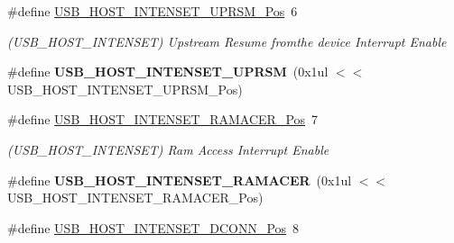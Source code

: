 \begin{DoxyCompactItemize}
\item 
\hypertarget{group___s_a_m_l21___u_s_b_ga447cdc0932f5fadd6ca31dabbf7ed24f}{}\#define \hyperlink{group___s_a_m_l21___u_s_b_ga447cdc0932f5fadd6ca31dabbf7ed24f}{U\+S\+B\+\_\+\+H\+O\+S\+T\+\_\+\+I\+N\+T\+E\+N\+S\+E\+T\+\_\+\+U\+P\+R\+S\+M\+\_\+\+Pos}~6\label{group___s_a_m_l21___u_s_b_ga447cdc0932f5fadd6ca31dabbf7ed24f}

\begin{DoxyCompactList}\small\item\em (U\+S\+B\+\_\+\+H\+O\+S\+T\+\_\+\+I\+N\+T\+E\+N\+S\+E\+T) Upstream Resume fromthe device Interrupt Enable \end{DoxyCompactList}\item 
\hypertarget{group___s_a_m_l21___u_s_b_ga113619d8b57aecb308c0adb79c029053}{}\#define {\bfseries U\+S\+B\+\_\+\+H\+O\+S\+T\+\_\+\+I\+N\+T\+E\+N\+S\+E\+T\+\_\+\+U\+P\+R\+S\+M}~(0x1ul $<$$<$ U\+S\+B\+\_\+\+H\+O\+S\+T\+\_\+\+I\+N\+T\+E\+N\+S\+E\+T\+\_\+\+U\+P\+R\+S\+M\+\_\+\+Pos)\label{group___s_a_m_l21___u_s_b_ga113619d8b57aecb308c0adb79c029053}

\item 
\hypertarget{group___s_a_m_l21___u_s_b_gaabaa6f4dc758d21af2306fa941a13363}{}\#define \hyperlink{group___s_a_m_l21___u_s_b_gaabaa6f4dc758d21af2306fa941a13363}{U\+S\+B\+\_\+\+H\+O\+S\+T\+\_\+\+I\+N\+T\+E\+N\+S\+E\+T\+\_\+\+R\+A\+M\+A\+C\+E\+R\+\_\+\+Pos}~7\label{group___s_a_m_l21___u_s_b_gaabaa6f4dc758d21af2306fa941a13363}

\begin{DoxyCompactList}\small\item\em (U\+S\+B\+\_\+\+H\+O\+S\+T\+\_\+\+I\+N\+T\+E\+N\+S\+E\+T) Ram Access Interrupt Enable \end{DoxyCompactList}\item 
\hypertarget{group___s_a_m_l21___u_s_b_ga1548d6541cd36d5743efea1d04412597}{}\#define {\bfseries U\+S\+B\+\_\+\+H\+O\+S\+T\+\_\+\+I\+N\+T\+E\+N\+S\+E\+T\+\_\+\+R\+A\+M\+A\+C\+E\+R}~(0x1ul $<$$<$ U\+S\+B\+\_\+\+H\+O\+S\+T\+\_\+\+I\+N\+T\+E\+N\+S\+E\+T\+\_\+\+R\+A\+M\+A\+C\+E\+R\+\_\+\+Pos)\label{group___s_a_m_l21___u_s_b_ga1548d6541cd36d5743efea1d04412597}

\item 
\hypertarget{group___s_a_m_l21___u_s_b_gaa679c274d95c23452bc912164018ad66}{}\#define \hyperlink{group___s_a_m_l21___u_s_b_gaa679c274d95c23452bc912164018ad66}{U\+S\+B\+\_\+\+H\+O\+S\+T\+\_\+\+I\+N\+T\+E\+N\+S\+E\+T\+\_\+\+D\+C\+O\+N\+N\+\_\+\+Pos}~8\label{group___s_a_m_l21___u_s_b_gaa679c274d95c23452bc912164018ad66}


\end{DoxyCompactItemize}
